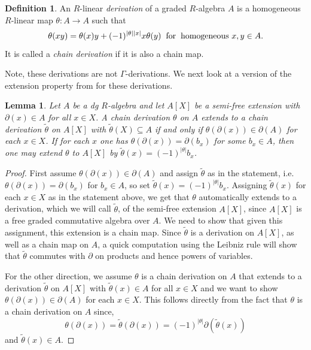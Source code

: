 \documentclass{amsart}
\newtheorem{lem}[theorem]{Lemma}
\theoremstyle{definition}
\newtheorem{defn}[theorem]{Definition}
\theoremstyle{remark}
\begin{document}
 \begin{defn}
     An $R$-linear \textit{derivation} of a graded $R$-algebra $A$ is a homogeneous $R$-linear map $\theta: A \to A$ such that
     \[
     \theta(xy) = \theta(x)y+(-1)^{|\theta||x|}x\theta(y)  \hspace{2mm}\text{for} \hspace{2mm} \text{homogeneous} \, \, x,y\in A.
     \]
     It is called a \textit{chain derivation} if it is also a chain map.
    
  \end{defn}

Note, these derivations are not $\Gamma$-derivations. We next look at a version of the extension property from \cite{GulliksenLevin} for these derivations.


  \begin{lem}
  \label{Extension Lemma}
      Let $A$ be a dg $R$-algebra and let $A[X]$ be a semi-free extension with $\partial(x) \in A$ for all $x \in X$. 
      A chain derivation $\theta$ on $A$  extends to a chain derivation $\widetilde{\theta}$ on $A[X]$ with $\widetilde{\theta}(X) \subseteq A$ if and only if $\theta(\partial(x))\in \partial(A)$ for each $x \in X$. If for each $x$ one has $\theta(\partial (x))= \partial(b_x)$ for some $b_x\in A$, then one may extend $\theta$ to $A[X]$ by $\widetilde{\theta}(x)=(-1)^{|\theta|}b_x$.

      \end{lem}

\begin{proof}
First assume $\theta(\partial(x)) \in \partial(A)$ and assign $\widetilde{\theta}$ as in the statement, i.e. $\theta(\partial (x))=
\partial(b_x)$ for $b_x\in A$, so set $\widetilde{\theta}(x)=(-1)^{|\theta|}b_x$. 
Assigning $\widetilde{\theta}(x)$ for each $x \in X$ as in the statement above, we get that $\theta$ automatically extends to a derivation, which we will call $\widetilde{\theta}$, of the semi-free extension $A[X]$, since $A[X]$ is a free graded commutative algebra over $A$. We need to show that given this assignment, this extension is a chain map. Since $\widetilde{\theta}$ is a derivation on $A[X]$, as well as a chain map on $A$, a quick computation using the Leibniz rule will show that $\widetilde{\theta}$ commutes with $\partial$ on products and hence powers of variables.


For the other direction, we assume $\theta$ is a chain derivation on $A$ that extends to a derivation $\widetilde{\theta}$ on $A[X]$ with $\widetilde{\theta}(x)\in A$ for all $x \in X$ and we want to show $\theta(\partial(x))\in \partial(A)$ for each $x\in X$. This follows directly from the fact that $\theta$ is a chain derivation on $A$ since,
\[
\theta(\partial(x)) = \widetilde{\theta}(\partial(x)) = (-1)^{|\theta|}\partial(\widetilde{\theta}(x))
\]
and $\widetilde{\theta}(x) \in A$.
\end{proof}
\end{document}
